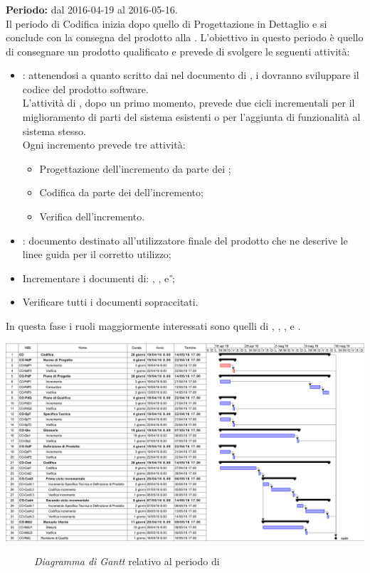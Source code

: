 \subsubsection{\CO}
\textbf{Periodo:} dal 2016-04-19 al 2016-05-16. \\
Il periodo di Codifica inizia dopo quello di Progettazione in Dettaglio e si conclude con la consegna del prodotto alla \RQ. L'obiettivo in questo periodo è quello di consegnare un prodotto qualificato e prevede di svolgere le seguenti attività:
\begin{itemize}
	\item \textbf{\CO}: attenendosi a quanto scritto dai \textit{\Progs} nel documento di \textit{\DDP}, i \textit{\Progrs} dovranno sviluppare il codice del prodotto software.\\
	L'attività di \CO, dopo un primo momento, prevede due cicli incrementali per il miglioramento di parti del sistema esistenti o per l'aggiunta di funzionalità al sistema stesso. \\
	Ogni incremento prevede tre attività:
	\begin{itemize}
		\item Progettazione dell'incremento da parte dei \textit{\Progs};
		\item Codifica da parte dei \textit{\Progrs} dell'incremento;
		\item Verifica dell'incremento.
	\end{itemize}
	\item \textit{\MU}: documento destinato all'utilizzatore finale del prodotto che ne descrive le linee guida per il corretto utilizzo;
	\item Incrementare i documenti di: \textit{\NdP}, \textit{\PdP}, \textit{\PdQ} e \textit{\G};
	\item Verificare tutti i documenti sopraccitati.
\end{itemize}
In questa fase i ruoli maggiormente interessati sono quelli di \textit{\Amm}, \textit{\Res}, \textit{\Prog}, \textit{\Progr} e \textit{\Ver}.
\begin{center}
	\includegraphics[keepaspectratio = true, width=16cm]{immagini/PdP_CodificaGantt.png}
\end{center}
\begin{figure}[h]
	\caption{\textit{Diagramma di Gantt} relativo al periodo di \CO}\label{etichetta}
\end{figure}

